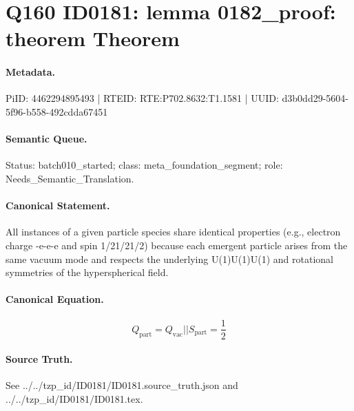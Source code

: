 \section*{Q160 ID0181: lemma 0182\_proof: theorem Theorem}
\paragraph{Metadata.}
PiID: 4462294895493 | RTEID: RTE:P702.8632:T1.1581 | UUID: d3b0dd29-5604-5f96-b558-492cdda67451

\paragraph{Semantic Queue.}
Status: batch010\_started; class: meta\_foundation\_segment; role: Needs\_Semantic\_Translation.

\paragraph{Canonical Statement.}
All instances of a given particle species share identical properties (e.g., electron charge -e-e-e and spin 1/21/21/2) because each emergent particle arises from the same vacuum mode and respects the underlying U(1)U(1)U(1) and rotational symmetries of the hyperspherical field.

\paragraph{Canonical Equation.}
\[
Q_{\mathrm{part}} = Q_{\mathrm{vac}} || S_{\mathrm{part}} = \frac{1}{2}
\]

\paragraph{Source Truth.}
See ../../tzp\_id/ID0181/ID0181.source\_truth.json and ../../tzp\_id/ID0181/ID0181.tex.
